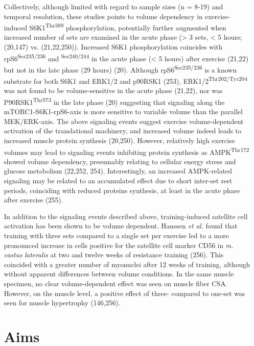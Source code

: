\documentclass[twoside,10pt]{gihclass} %
\begin{document}
Collectively, although limited with regard to sample sizes (n = 8-19) and temporal resolution,
these studies points to volume dependency in exercise-induced S6K1\textsuperscript{Thr389} phosphorylation, potentially further augmented when increased number of sets are examined in the acute phase
(\textgreater{} 3 sets, \textless{} 5 hours; (20,147) vs. (21,22,250)).
Increased S6K1 phosphorylation coincides with rpS6\textsuperscript{Ser235/236} and \textsuperscript{Ser240/244} in the acute phase (\textless{} 5 hours) after exercise
(21,22) but not in the late phase (29 hours) (20).
Although rpS6\textsuperscript{Ser235/236} is a known substrate for both S6K1 and ERK1/2 and p90RSK1
(253),
ERK1/2\textsuperscript{Thr202/Tyr204} was not found to be volume-sensitive in the acute phase
(21,22),
nor was P90RSK1\textsuperscript{Thr573} in the late phase (20)
suggesting that signaling along the mTORC1-S6K1-rpS6-axis is more sensitive to variable volume than the parallel MEK/ERK-axis.
The above signaling events suggest exercise volume-dependent activation of the translational machinery, and increased volume indeed leads to increased muscle protein synthesis
(20,250).
However, relatively high exercise volumes may lead to signaling events inhibiting protein synthesis as AMPK\textsuperscript{Thr172} showed volume dependency, presumably relating to cellular energy stress and glucose metabolism
(22,252, 254).
Interestingly, an increased AMPK-related signaling may be related to an accumulated effect due to short inter-set rest periods, coinciding with reduced proteins synthesis, at least in the acute phase after exercise
(255).

In addition to the signaling events described above, training-induced satellite cell activation has been shown to be volume dependent.
Hanssen \emph{et al.} found that training with three sets compared to a single set per exercise led to a more pronounced increase in cells positive for the satellite cell marker CD56 in \emph{m. vastus lateralis} at two and twelve weeks of resistance training (256).
This coincided with a greater number of myonuclei after 12 weeks of training, although without apparent differences between volume conditions.
In the same muscle specimen, no clear volume-dependent effect was seen on muscle fiber CSA. However, on the muscle level, a positive effect of three- compared to one-set was seen for muscle hypertrophy
(146,256).

\hypertarget{aims}{%
\chapter{Aims}\label{aims}}
\end{document}
